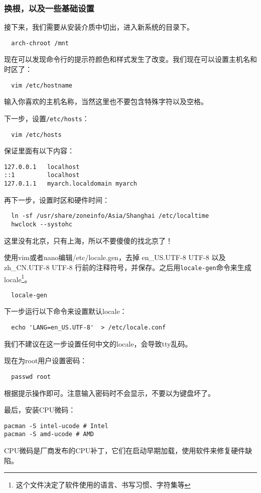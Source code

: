 \documentclass[../main.tex]{subfiles}
\begin{document}
\subsubsection{换根，以及一些基础设置}

接下来，我们需要从安装介质中切出，进入新系统的目录下。

\begin{lstlisting}
  arch-chroot /mnt
\end{lstlisting}

现在可以发现命令行的提示符颜色和样式发生了改变。我们现在可以设置主机名和时区了：
\begin{lstlisting}
  vim /etc/hostname
\end{lstlisting}
输入你喜欢的主机名称，当然这里也不要包含特殊字符以及空格。

下一步，设置\texttt{/etc/hosts}：
\begin{lstlisting}
  vim /etc/hosts
\end{lstlisting}
保证里面有以下内容：
\begin{lstlisting}
127.0.0.1   localhost
::1         localhost
127.0.1.1   myarch.localdomain myarch
\end{lstlisting}

再下一步，设置时区和硬件时间：
\begin{lstlisting}
  ln -sf /usr/share/zoneinfo/Asia/Shanghai /etc/localtime
  hwclock --systohc
\end{lstlisting}
这里没有北京，只有上海，所以不要傻傻的找北京了！

使用vim或者nano编辑/etc/locale.gen，去掉 en\_US.UTF-8 UTF-8 以及 zh\_CN.UTF-8 UTF-8 行前的注释符号，并保存。之后用\texttt{locale-gen}命令来生成locale\footnote{这个文件决定了软件使用的语言、书写习惯、字符集等}。

\begin{lstlisting}
  locale-gen
\end{lstlisting}

下一步运行以下命令来设置默认locale：
\begin{lstlisting}
  echo 'LANG=en_US.UTF-8'  > /etc/locale.conf
\end{lstlisting}
我们不建议在这一步设置任何中文的locale，会导致tty乱码。

现在为root用户设置密码：
\begin{lstlisting}
  passwd root
\end{lstlisting}
根据提示操作即可。注意输入密码时不会显示，不要以为键盘坏了。

最后，安装CPU微码：
\begin{lstlisting}
pacman -S intel-ucode # Intel
pacman -S amd-ucode # AMD
\end{lstlisting}
CPU微码是厂商发布的CPU补丁，它们在启动早期加载，使用软件来修复硬件缺陷。
\end{document}
